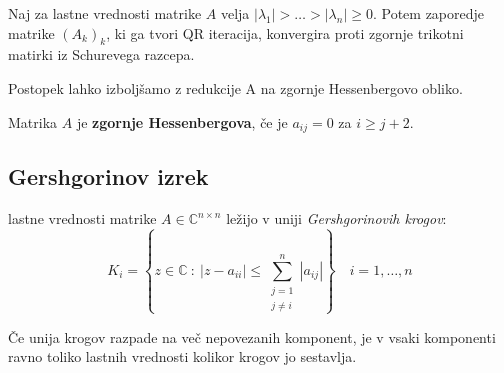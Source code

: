 \begin{multicols}{5}
Naj za lastne vrednosti matrike $A$ velja $|\lambda_1| > \dots > |\lambda_n| \geq 0$. Potem
zaporedje matrike $(A_k)_k$, ki ga tvori QR iteracija, konvergira proti zgornje trikotni matirki iz Schurevega razcepa.

Postopek lahko izboljšamo z redukcije A na zgornje Hessenbergovo obliko.

Matrika $A$ je \textbf{zgornje Hessenbergova}, če je $a_{ij} = 0$ za $i \geq j+2$.

\subsection*{Gershgorinov izrek}
lastne vrednosti matrike $A \in \mathbb{C}^{n\times n}$ ležijo v uniji \textit{Gershgorinovih krogov}:
\[ K_i = \left\{z \in \mathbb{C} \ : \ |z-a_{ii}| \leq \sum_{\substack{j = 1 \\ j \neq i}}^n |a_{ij}|\right\} \quad i = 1, \dots, n\]

Če unija krogov razpade na več nepovezanih komponent, je v vsaki komponenti ravno toliko lastnih
vrednosti kolikor krogov jo sestavlja.
\end{multicols}
